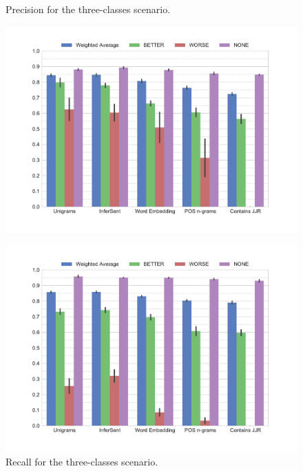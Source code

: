 \begin{figure}[h]
    \begin{minipage}{.5\textwidth}
   \caption{Precision for the three-classes scenario.} 
    \label{tbl:3_conf_inf}
 \centering
 \hspace*{-1cm}
	\includegraphics[width=1.25\textwidth]{images/experiments/precision-False}
  \end{minipage} \hfill
    \begin{minipage}{.5\textwidth}
   \hspace*{+1cm}
     \caption{Recall for the three-classes scenario.} 
       \label{tbl:3_conf_uni}
 \centering
	\includegraphics[width=1.25\textwidth]{images/experiments/recall-False}
    \end{minipage} 
\end{figure}

